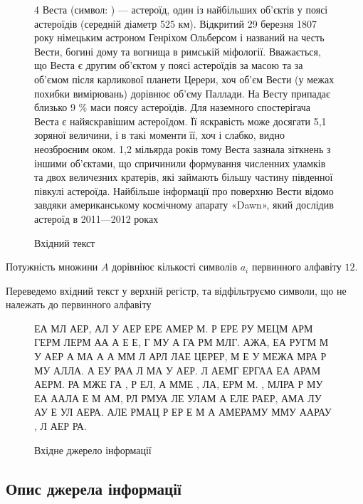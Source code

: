 \documentclass[a4paper,14pt]{extreport}
\begin{document}
 \begin{figure}[h]
	\centering
	\begin{minipage}{0.8\textwidth}  %
	4 Веста (символ: \Vesta) — астероїд, один із найбільших об'єктів у поясі астероїдів (середній діаметр 525 км). Відкритий 29 березня 1807 року німецьким астроном Генріхом Ольберсом і названий на честь Вести, богині дому та вогнища в римській міфології. Вважається, що Веста є другим об'єктом у поясі астероїдів за масою та за об'ємом після карликової планети Церери, хоч об'єм Вести (у межах похибки вимірювань) дорівнює об'єму Паллади. На Весту припадає близько 9 \% маси поясу астероїдів. Для наземного спостерігача Веста є найяскравішим астероїдом. Її яскравість може досягати 5,1 зоряної величини, і в такі моменти її, хоч і слабко, видно неозброєним оком. 1,2 мільярда років тому Веста зазнала зіткнень з іншими об'єктами, що спричинили формування численних уламків та двох величезних кратерів, які займають більшу частину південної півкулі астероїда. Найбільше інформації про поверхню Вести відомо завдяки американському космічному апарату «Dawn», який дослідив астероїд в 2011—2012 роках
	\end{minipage}
	\caption*{Вхідний текст}
	\label{fig:sample-text}
\end{figure}


Потужність множини $A$ дорівніює кількості символів $a_i$ первинного алфавіту $12$. 

Переведемо вхідний текст у  верхній регістр, та відфільтруємо символи, що не належать до первинного алфавіту


 \begin{figure}[h]
	\centering
	\begin{minipage}{0.8\textwidth}  %
	ЕА МЛ   АЕР,   АЛ  У  АЕР ЕРЕ АМЕР  М. Р  ЕРЕ  РУ МЕЦМ АРМ ГЕРМ ЛЕРМ  АА А Е Е, Г МУ А ГА  РМ МЛГ. АЖА,  ЕА  РУГМ М У  АЕР А МА А А ММ Л АРЛ ЛАЕ ЦЕРЕР,  М Е У МЕЖА  МРА Р МУ АЛЛА. А ЕУ РАА Л   МА У АЕР. Л АЕМГ ЕРГАА ЕА  АРАМ АЕРМ.  РА МЖЕ ГА , Р ЕЛ,   А ММЕ ,   ЛА,  ЕРМ М. , МЛРА Р МУ ЕА ААЛА Е  М АМ,  РЛ РМУА ЛЕ УЛАМ А  ЕЛЕ РАЕР,  АМА ЛУ АУ Е УЛ АЕРА. АЛЕ РМАЦ Р ЕР Е М А АМЕРАМУ ММУ ААРАУ ,  Л АЕР   РА.
	\end{minipage}
	
	\caption*{Вхідне джерело інформації} %
	\label{fig:filtered-text}
\end{figure}

\subsection{Опис джерела інформації}
 
\end{document}
